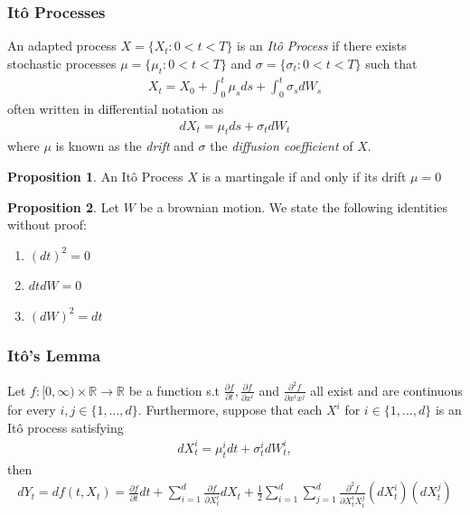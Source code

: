 \documentclass{article}
\theoremstyle{definition}
\newtheorem{proposition}{Proposition}
\begin{document}
\subsubsection{Itô Processes}
An adapted process $ X = \{X_{t}: 0 < t< T\}$ is an \textit{Itô Process} if there exists stochastic processes $\mu = \{\mu_{t}: 0 < t< T\}$ and $\sigma = \{\sigma_{t}: 0 < t< T\}$ such that
\begin{align}
    X_{t} = X_{0} + \int_{0}^{t}\mu_{s} ds + \int_{0}^{t}\sigma_{s} dW_{s}
\end{align}
often written in differential notation as 
\begin{align}
    dX_{t} = \mu_{t} ds + \sigma_{t} dW_{t}
\end{align}
where $\mu$ is known as the \textit{drift} and $\sigma$ the \textit{diffusion coefficient} of $X$.
\label{Martingale iff drift zero}
\begin{proposition}
   An Itô Process $X$ is a martingale if and only if its drift $\mu = 0$ 
\end{proposition}

\label{box calculus}
\begin{proposition}
    Let $W$ be a brownian motion. We state the following identities without proof:
    \begin{enumerate}
    \item $(dt)^2=0$
    \item $dt dW =0$
    \item $(dW)^2 = dt$
    \end{enumerate}
\end{proposition}

\subsubsection{Itô's Lemma}
Let $f:[0,\infty) \times \mathbb{R} \rightarrow \mathbb{R}$ be a function s.t $\frac{\partial f}{\partial t},\frac{\partial f}{\partial x^{i}} $ and $ \frac{\partial ^{2} f}{\partial x^{i}x^{j}}$ all exist and are continuous for every $i,j \in \{1,...,d\}$. Furthermore, suppose that each $X^{i}$ for $i \in \{1,...,d\}$ is an Itô process satisfying
\begin{align}
dX_t^{i} = \mu_t^{i} dt + \sigma_t^{i} dW_t^{i},
\end{align}
then 
\begin{align}
\label{Ito'sLemma}
dY_t = df(t, X_{t}) = \frac{\partial f}{\partial t} dt + \sum_{i = 1}^{d}\frac{\partial f}{\partial X_t^{i}} dX_t + \frac{1}{2} \sum_{i=1}^{d} \sum_{j=1}^{d} \frac{\partial^2 f}{\partial X_t^{i} X_{t}^{j}} (dX_{t}^{i})(dX_{t}^{j})
\end{align}
\end{document}
